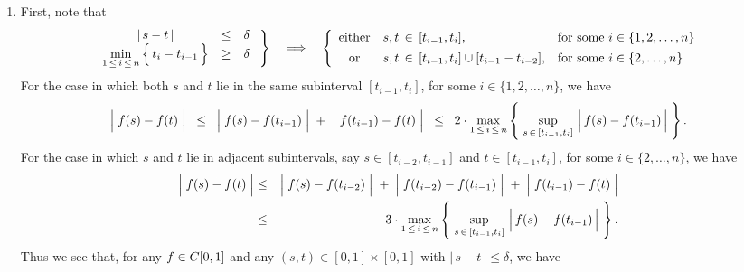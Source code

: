 \begin{enumerate}
\item	First, note that
		\begin{equation*}
		\left.
		\begin{array}{ccc}
			\vert\,s - t\,\vert &\leq& \delta
			\\
			\underset{1\,\leq\,i\,\leq\,n}{\min}\left\{\,\overset{{\color{white}.}}{t}_{i} - t_{i-1}\,\right\} &\geq& \delta
		\end{array}
		\;\right\}
		\quad\Longrightarrow\quad
		\left\{\begin{array}{cll}
			\textnormal{either} & s,t\,\in\,[t_{i-1},t_{i}], & \textnormal{for some $i\in\{1,2,\ldots,n\}$}
			\\
			\textnormal{or} & s,t\,\overset{{\color{white}1}}{\in}\,[t_{i-1},t_{i}]\cup[t_{i-1}-t_{i-2}], & \textnormal{for some $i\in\{2,\ldots,n\}$}
		\end{array}\right.
		\end{equation*}
		For the case in which both $s$ and $t$ lie in the same subinterval $[t_{i-1},t_{i}]$,
		for some $i\in\{1,2,\ldots,n\}$, we have
		\begin{equation*}
		\left\vert\;f(s)\overset{{\color{white}.}}{-}f(t)\;\right\vert
		\;\;\leq\;\;
			\left\vert\;f(s)\overset{{\color{white}.}}{-}f(t_{i-1})\;\right\vert
			\;+\;\left\vert\;f(t_{i-1})\overset{{\color{white}.}}{-}f(t)\;\right\vert
		\;\;\leq\;\;
			2\cdot\underset{1\,\leq\,i\,\leq\,n}{\max}\left\{\;
				\sup_{s\,\in\,[t_{i-1},t_{i}]}\,\left\vert\,\overset{{\color{white}.}}{f}(s) - f(t_{i-1})\,\right\vert
			\;\right\}.
		\end{equation*}
		For the case in which $s$ and $t$ lie in adjacent subintervals,
		say $s \in [t_{i-2},t_{i-1}]$ and $t \in [t_{i-1},t_{i}]$,
		for some $i\in\{2,\ldots,n\}$, we have
		\begin{eqnarray*}
		\left\vert\;f(s)\overset{{\color{white}.}}{-}f(t)\;\right\vert
		&\leq&
			\left\vert\;f(s)\overset{{\color{white}.}}{-}f(t_{i-2})\;\right\vert
			\;+\;\left\vert\;f(t_{i-2})\overset{{\color{white}.}}{-}f(t_{i-1})\;\right\vert
			\;+\;\left\vert\;f(t_{i-1})\overset{{\color{white}.}}{-}f(t)\;\right\vert
		\\
		&\leq&
			3\cdot\underset{1\,\leq\,i\,\leq\,n}{\max}\left\{\;
				\sup_{s\,\in\,[t_{i-1},t_{i}]}\,\left\vert\,\overset{{\color{white}.}}{f}(s) - f(t_{i-1})\,\right\vert
			\;\right\}.
		\end{eqnarray*}
		Thus we see that,
		for any $f \in C[0,1]$ and any $(s,t)\in[0,1]\times[0,1]$ with $\vert\,s-t\,\vert\leq\delta$, we have

\end{enumerate}
